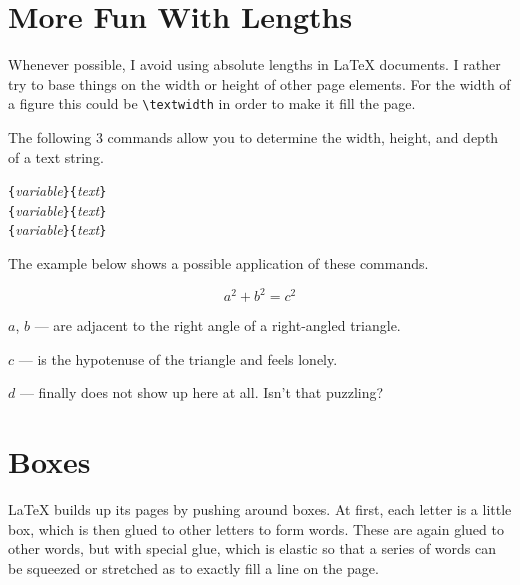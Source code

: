 \section{More Fun With Lengths}

Whenever possible, I avoid using absolute lengths in
\LaTeX{} documents. I rather try to base things on the width or height
of other page elements. For the width of a figure this could
be \verb|\textwidth| in order to make it fill the page.

The following 3 commands allow you to determine the width, height, and
depth of a text string.

\begin{lscommand}
  \verb|{|\emph{variable}\verb|}{|\emph{text}\verb|}|\\
  \verb|{|\emph{variable}\verb|}{|\emph{text}\verb|}|\\
  \verb|{|\emph{variable}\verb|}{|\emph{text}\verb|}|
\end{lscommand}

\noindent The example below shows a possible application of these commands.

\begin{example}[examplewidth=0.45\linewidth]
\newenvironment{vardesc}[1]{%
  \settowidth{\parindent}{#1:\ }
  \makebox[0pt][r]{#1:\ }}{}

\begin{displaymath}
a^2+b^2=c^2
\end{displaymath}

\begin{vardesc}{Where}\(a\),
\(b\) --- are adjacent to the right
angle of a right-angled triangle.

\(c\) --- is the hypotenuse of
the triangle and feels lonely.

\(d\) --- finally does not show up
here at all. Isn't that puzzling?
\end{vardesc}
\end{example}

\section{Boxes}\label{sec:boxes}
\LaTeX{} builds up its pages by pushing around boxes. At first, each
letter is a little box, which is then glued to other letters to form
words. These are again glued to other words, but with special glue,
which is elastic so that a series of words can be squeezed or
stretched as to exactly fill a line on the page.

